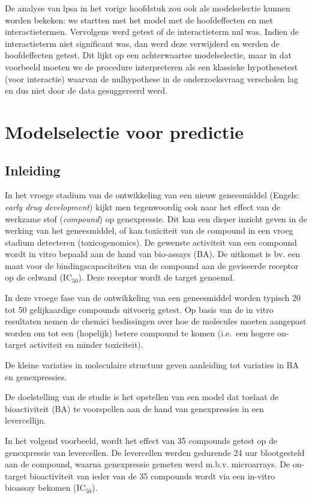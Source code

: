 \documentclass[
  dutch,
  letterpaper,
  12pt]{book}
\theoremstyle{definition}
\theoremstyle{definition}
\theoremstyle{definition}
\theoremstyle{remark}
\begin{document}
De analyse van lpsa in het vorige hoofdstuk zou ook als modelselectie
kunnen worden bekeken: we startten met het model met de hoofdeffecten en
met interactietermen. Vervolgens werd getest of de interactieterm nul
was. Indien de interactieterm niet significant was, dan werd deze
verwijderd en werden de hoofdeffecten getest. Dit lijkt op een
achterwaartse modelselectie, maar in dat voorbeeld moeten we de
procedure interpreteren als een klassieke hypothesetest (voor
interactie) waarvan de nulhypothese in de onderzoeksvraag verscholen lag
en dus niet door de data gesuggereerd werd.

\section{Modelselectie voor
predictie}\label{modelselectie-voor-predictie}

\subsection{Inleiding}\label{inleiding-11}

In het vroege stadium van de ontwikkeling van een nieuw geneesmiddel
(Engels: \emph{early drug development}) kijkt men tegenwoordig ook naar
het effect van de werkzame stof (\emph{compound}) op genexpressie. Dit
kan een dieper inzicht geven in de werking van het geneesmiddel, of kan
toxiciteit van de compound in een vroeg stadium detecteren
(toxicogenomics). De gewenste activiteit van een compound wordt in vitro
bepaald aan de hand van bio-assays (BA). De uitkomst is bv. een maat
voor de bindingscapaciteiten van de compound aan de geviseerde receptor
op de celwand (IC\(_{50}\)). Deze receptor wordt de target genoemd.

In deze vroege fase van de ontwikkeling van een geneesmiddel worden
typisch 20 tot 50 gelijkaardige compounds uitvoerig getest. Op basis van
de in vitro resultaten nemen de chemici beslissingen over hoe de
molecules moeten aangepast worden om tot een (hopelijk) betere compound
te komen (i.e.~een hogere on-target activiteit en minder toxiciteit).

De kleine variaties in moleculaire structuur geven aanleiding tot
variaties in BA en genexpressies.

De doelstelling van de studie is het opstellen van een model dat toelaat
de bioactiviteit (BA) te voorspellen aan de hand van genexpressies in
een levercellijn.

In het volgend voorbeeld, wordt het effect van 35 compounds getest op de
genexpressie van levercellen. De levercellen werden gedurende 24 uur
blootgesteld aan de compound, waarna genexpressie gemeten werd m.b.v.
microarrays. De on-target bioactiviteit van ieder van de 35 compounds
wordt via een in-vitro bioassay bekomen (IC\(_{50}\)).
\end{document}
